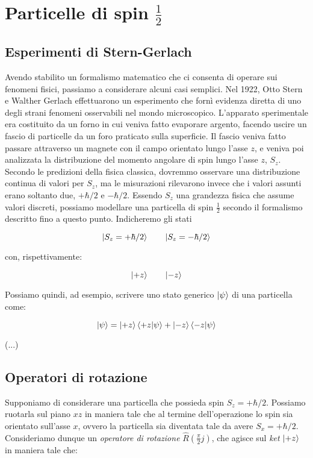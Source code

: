 \section{Particelle di spin $\frac{1}{2}$}

\subsection{Esperimenti di Stern-Gerlach}

Avendo stabilito un formalismo matematico che ci consenta di operare sui fenomeni fisici, passiamo a considerare alcuni casi semplici.
Nel 1922, Otto Stern e Walther Gerlach effettuarono un esperimento che fornì evidenza diretta di uno degli strani fenomeni osservabili nel mondo microscopico.
L'apparato sperimentale era costituito da un forno in cui veniva fatto evaporare argento, facendo uscire un fascio di particelle da un foro praticato sulla superficie.
Il fascio veniva fatto passare attraverso un magnete con il campo orientato lungo l'asse $z$, e veniva poi analizzata la distribuzione del momento angolare di spin lungo l'asse $z$, $S_z$.
Secondo le predizioni della fisica classica, dovremmo osservare una distribuzione continua di valori per $S_z$, ma le misurazioni
rilevarono invece che i valori assunti erano soltanto due, $+ \hbar / 2$ e $- \hbar / 2$.
Essendo $S_z$ una grandezza fisica che assume valori discreti, possiamo modellare una particella di spin $\frac{1}{2}$ secondo il formalismo descritto fino a questo punto. Indicheremo gli stati

	\[
		\ket{S_z = + \hbar / 2} \quad \quad \ket{S_z = - \hbar / 2}
	\]

con, rispettivamente:

	\[
		\ket{+z} \quad \quad \ket{-z}
	\]

Possiamo quindi, ad esempio, scrivere uno stato generico $\ket{\psi}$ di una particella come:

	\begin{equation}
		\ket{\psi} =  \ket{+z} \braket{+z}{\psi} + \ket{-z} \braket{-z}{\psi}
	\end{equation}

(...)

\subsection{Operatori di rotazione}

Supponiamo di considerare una particella che possieda spin $S_z = + \hbar / 2$. Possiamo ruotarla sul piano $xz$ in maniera tale che al termine dell'operazione lo spin sia orientato sull'asse $x$, ovvero la particella sia diventata tale da avere $S_x = + \hbar / 2 $. Consideriamo dunque un \textit{operatore di rotazione} $\hat{R}(\frac{\pi}{2} j)$, che agisce sul \textit{ket} $\ket{+z}$ in maniera tale che:

